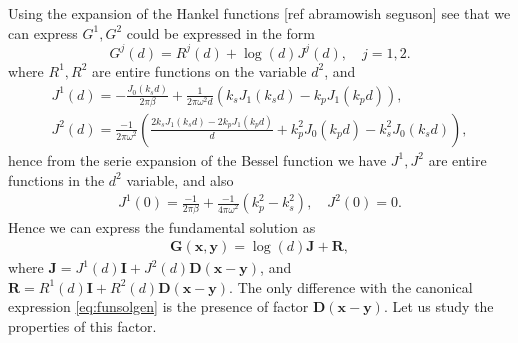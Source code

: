 \documentclass{article}
\newcommand{\todo}[1]{{\color{red}[#1]}}
\newcommand{\bx}{\bm{x}}
\newcommand{\by}{\bm{y}}
\begin{document}
Using the expansion of the Hankel functions \todo{ref abramowish seguson} see that we can express $G^1,G^2$ could be expressed in the form 
$$
G^j(d) = R^j(d) +\log(d)J^j(d), \quad j=1,2.
$$
where $R^1,R^2$ are entire functions on the variable $d^2$, and 
\begin{align*}
J^1(d) = -\frac{J_0(k_s d)}{2\pi\beta}+ \frac{1}{2\pi\omega^2 d}(k_sJ_1(k_s d) - k_p J_1(k_p d)), \\
J^2(d) = \frac{-1}{2 \pi \omega^2} \left(
\frac{2k_s J_1(k_sd)-2k_p J_1(k_p d)}{d} +k_p^2J_0(k_p d) -k_s^2J_0(k_s d)
\right),
\end{align*}
hence from the serie expansion of the Bessel function we have $J^1,J^2$ are entire functions in the $d^2$ variable, and also 
\begin{align*}
J^1(0) = \frac{-1}{2\pi\beta} + \frac{-1}{4 \pi\omega^2}(k_p^2-k_s^2), \quad J^2(0) = 0.
\end{align*}
Hence we can express the fundamental solution as 
\begin{align*}
\mathbf{G}(\bx,\by) = \log(d)\mathbf{J}+ \mathbf{R},
\end{align*}
where $\mathbf{J} = J^1(d) \mathbf{I} +J^2(d)\mathbf{D}(\bx-\by)$, and 
$\mathbf{R} = R^1(d) \mathbf{I} +R^2(d) \mathbf{D}(\bx-\by)$. The only difference with the canonical expression  \eqref{eq:funsolgen} is the presence of factor $\mathbf{D}(\bx-\by)$. Let us study the properties of this factor. 
\end{document}
